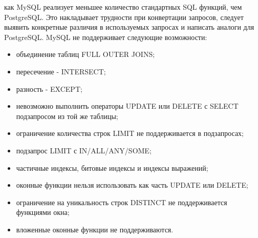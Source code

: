 как MySQL реализует меньшее количество стандартных SQL функций, чем PostgreSQL.
Это накладывает трудности при конвертации запросов, следует
выявить конкретные различия в используемых запросах и написать аналоги для PostgreSQL. 
MySQL не поддерживает следующие возможности:
\begin{itemize}
    \item объединение таблиц FULL OUTER JOINS;
    \item пересечение - INTERSECT;
    \item разность - EXCEPT;
    \item невозможно выполнить операторы UPDATE или DELETE с SELECT подзапросом из той же таблицы;
    \item ограничение количества строк LIMIT не поддерживается в подзапросах;
    \item подзапрос LIMIT с IN/ALL/ANY/SOME;
    \item частичные индексы, битовые индексы и индексы выражений;
    \item оконные функции нельзя использовать как часть UPDATE или DELETE;
    \item ограничение на уникальность строк DISTINCT не поддерживается функциями окна;
    \item вложенные оконные функции не поддерживаются.
\end{itemize} 

